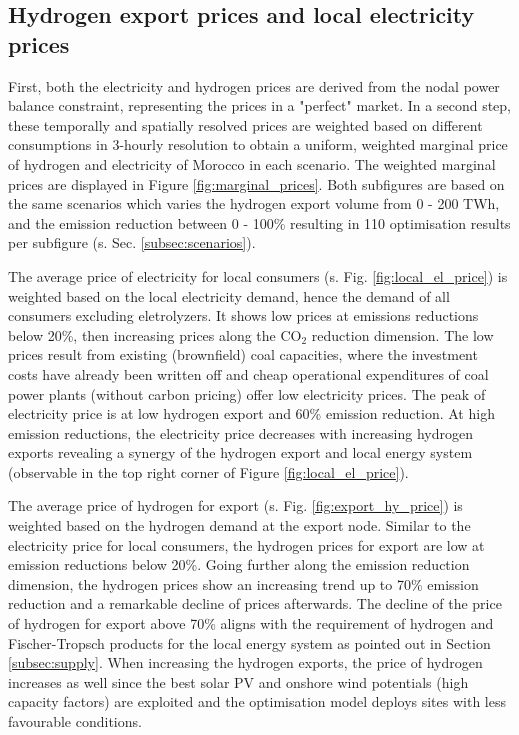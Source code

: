 \subsection{Hydrogen export prices and local electricity prices}
\label{subsec:results_prices}
First, both the electricity and hydrogen prices are derived from the nodal power balance constraint, representing the prices in a "perfect" market. %
In a second step, these temporally and spatially resolved prices are weighted based on different consumptions in 3-hourly resolution to obtain a uniform, weighted marginal price of hydrogen and electricity of Morocco in each scenario. The weighted marginal prices are displayed in Figure \ref{fig:marginal_prices}. Both subfigures are based on the same scenarios which varies the hydrogen export volume from 0 - 200 TWh, and the emission reduction between 0 - 100\% resulting in 110 optimisation results per subfigure (s. Sec. \ref{subsec:scenarios}).

The average price of electricity for local consumers (s. Fig. \ref{fig:local_el_price}) is weighted based on the local electricity demand, hence the demand of all consumers excluding eletrolyzers. It shows low prices at emissions reductions below 20\%, then increasing prices along the $\mathrm{CO_2}$ reduction dimension. The low prices result from existing (brownfield) coal capacities, where the investment costs have already been written off and cheap operational expenditures of coal power plants (without carbon pricing) offer low electricity prices. The peak of electricity price is at low hydrogen export and 60\% emission reduction. At high emission reductions, the electricity price decreases with increasing hydrogen exports revealing a synergy of the hydrogen export and local energy system (observable in the top right corner of Figure \ref{fig:local_el_price}).

The average price of hydrogen for export (s. Fig. \ref{fig:export_hy_price}) is weighted based on the hydrogen demand at the export node. Similar to the electricity price for local consumers, the hydrogen prices for export are low at emission reductions below 20\%. Going further along the emission reduction dimension, the hydrogen prices show an increasing trend up to 70\% emission reduction and a remarkable decline of prices afterwards. The decline of the price of hydrogen for export above 70\% aligns with the requirement of hydrogen and Fischer-Tropsch products for the local energy system as pointed out in Section \ref{subsec:supply}. %
When increasing the hydrogen exports, the price of hydrogen increases as well since the best solar PV and onshore wind potentials (high capacity factors) are exploited and the optimisation model deploys sites with less favourable conditions. 

